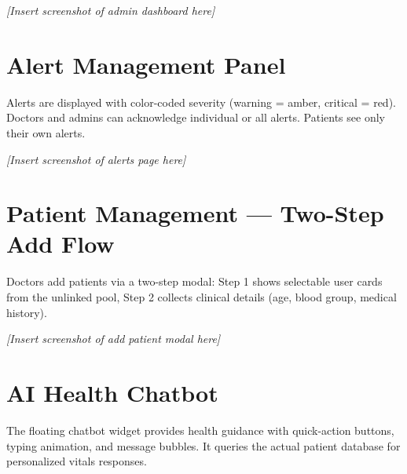 \documentclass[12pt,a4paper]{report}
\begin{document}

\noindent\textit{[Insert screenshot of admin dashboard here]}

\section{Alert Management Panel}
Alerts are displayed with color-coded severity (warning = amber, critical = red). Doctors and admins can acknowledge individual or all alerts. Patients see only their own alerts.


\noindent\textit{[Insert screenshot of alerts page here]}

\section{Patient Management --- Two-Step Add Flow}
Doctors add patients via a two-step modal: Step 1 shows selectable user cards from the unlinked pool, Step 2 collects clinical details (age, blood group, medical history).


\noindent\textit{[Insert screenshot of add patient modal here]}

\section{AI Health Chatbot}
The floating chatbot widget provides health guidance with quick-action buttons, typing animation, and message bubbles. It queries the actual patient database for personalized vitals responses.

\end{document}
